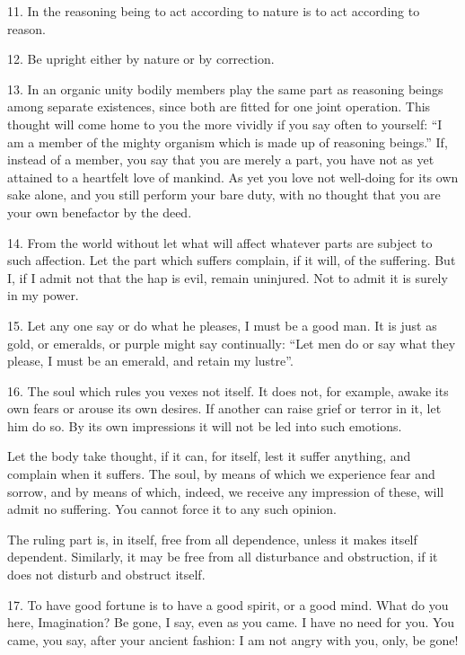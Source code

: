 \documentclass{book}
\begin{document}
11. In the reasoning being to act according to nature is to act
according to reason.

12. Be upright either by nature or by correction.

13. In an organic unity bodily members play the same part as reasoning
beings among separate existences, since both are fitted for one joint
operation. This thought will come home to you the more vividly if you
say often to yourself: ``I am a member of the mighty organism which is
made up of reasoning beings.'' If, instead of a member, you say that
you are merely a part, you have not as yet attained to a heartfelt
love of mankind. As yet you love not well-doing for its own sake
alone, and you still perform your bare duty, with no thought that you
are your own benefactor by the deed.

14. From the world without let what will affect whatever parts are
subject to such affection. Let the part which suffers complain, if it
will, of the suffering. But I, if I admit not that the hap is evil,
remain uninjured. Not to admit it is surely in my power.

\newpage

15. Let any one say or do what he pleases, I must be a good man. It is
just as gold, or emeralds, or purple might say continually: ``Let men
do or say what they please, I must be an emerald, and retain my
lustre''.

16. The soul which rules you vexes not itself. It does not, for
example, awake its own fears or arouse its own desires. If another can
raise grief or terror in it, let him do so. By its own impressions it
will not be led into such emotions.

Let the body take thought, if it can, for itself, lest it suffer
anything, and complain when it suffers. The soul, by means of which we
experience fear and sorrow, and by means of which, indeed, we receive
any impression of these, will admit no suffering. You cannot force it
to any such opinion.

The ruling part is, in itself, free from all dependence, unless it
makes itself dependent. Similarly, it may be free from all disturbance
and obstruction, if it does not disturb and obstruct itself.

17. To have good fortune is to have a good spirit, or a good
mind. What do you here, Imagination? Be gone, I say, even as you
came. I have no need for you. You came, you say, after your ancient
fashion: I am not angry with you, only, be gone!
\end{document}
